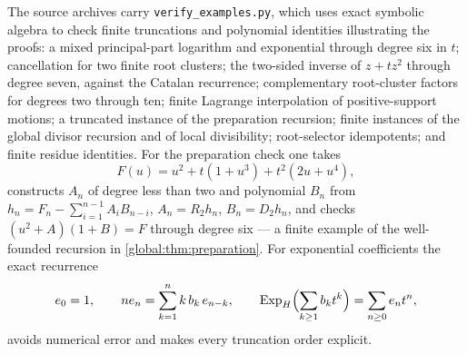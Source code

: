 \documentclass[11pt,letterpaper]{article}
\theoremstyle{definition}
\theoremstyle{remark}
\newcommand{\ExpH}{\operatorname{Exp}_{H}}
\numberwithin{equation}{section}
\begin{document}
The source archives carry \texttt{verify\_examples.py}, which uses exact symbolic algebra to check finite truncations and polynomial identities illustrating the proofs: a mixed principal-part logarithm and exponential through degree six in $t$; cancellation for two finite root clusters; the two-sided inverse of $z+tz^2$ through degree seven, against the Catalan recurrence; complementary root-cluster factors for degrees two through ten; finite Lagrange interpolation of positive-support motions; a truncated instance of the preparation recursion; finite instances of the global divisor recursion and of local divisibility; root-selector idempotents; and finite residue identities. For the preparation check one takes
\[
  F(u)=u^2+t(1+u^3)+t^2(2u+u^4),
\]
constructs $A_n$ of degree less than two and polynomial $B_n$ from $h_n=F_n-\sum_{i=1}^{n-1}A_iB_{n-i}$, $A_n=R_2h_n$, $B_n=D_2h_n$, and checks $(u^2+A)(1+B)=F$ through degree six --- a finite example of the well-founded recursion in \cref{global:thm:preparation}. For exponential coefficients the exact recurrence
\[
  e_0=1,\qquad n e_n=\sum_{k=1}^{n}k\,b_k\,e_{n-k},
  \qquad \ExpH\Bigl(\sum_{k\ge1}b_kt^k\Bigr)=\sum_{n\ge0}e_nt^n,
\]
avoids numerical error and makes every truncation order explicit.
\end{document}
